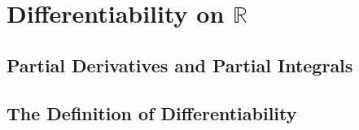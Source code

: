 \documentclass{report}
\begin{document}

\setcounter{chapter}{10}
\chapter{Differentiability on $\mathbb{R}$}
\thispagestyle{empty}
\newpage

\section{Partial Derivatives and Partial Integrals}

\setcounter{Exercise}{1}


\vspace{12pt}

\setcounter{Exercise}{3}


\vspace{12pt}




\section{The Definition of Differentiability}

\setcounter{Exercise}{1}


\vspace{12pt}



\vspace{12pt}



\vspace{12pt}



\vspace{12pt}



\vspace{12pt}

\setcounter{Exercise}{7}


\vspace{12pt}



\vspace{12pt}

\setcounter{Exercise}{10}

\end{document}
